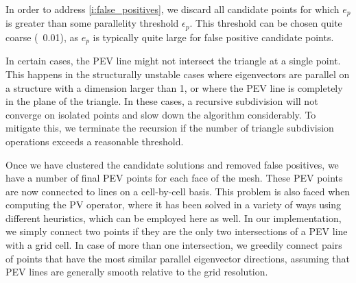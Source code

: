 %
In order to address \autoref{i:false_positives}, we discard all candidate points
for which $e_p$ is greater than some parallelity threshold $\epsilon_p$.
%
This threshold can be chosen quite coarse (\eg~0.01), as $e_p$ is typically
quite large for false positive candidate points.
%


%
In certain cases, the \ac{PEV} line might not intersect the triangle at a single
point.
%
This happens in the structurally unstable cases where eigenvectors are parallel
on a structure with a dimension larger than 1, or where the \ac{PEV} line is
completely in the plane of the triangle.
%
In these cases, a recursive subdivision will not converge on isolated points and
slow down the algorithm considerably.
%
To mitigate this, we terminate the recursion if the number of triangle
subdivision operations exceeds a reasonable threshold.
%

%
Once we have clustered the candidate solutions and removed false positives, we
have a number of final \ac{PEV} points for each face of the mesh.
%
These \ac{PEV} points are now connected to lines on a cell-by-cell basis.
%
This problem is also faced when computing the \ac{PV} operator, where it has been
solved in a variety of ways using different heuristics, which can be employed
here as well.
%
In our implementation, we simply connect two points if they are the only
two intersections of a \ac{PEV} line with a grid cell.
%
In case of more than one intersection, we greedily connect pairs of points
that have the most similar parallel eigenvector directions, assuming that
\ac{PEV} lines are generally smooth relative to the grid resolution.
%
